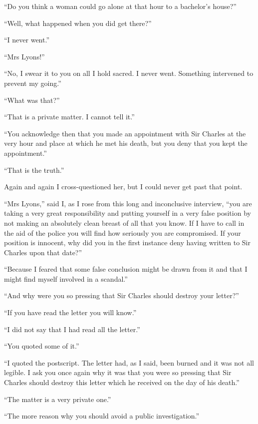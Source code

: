 \documentclass[paper=5.5in:8.5in,BCOR=7mm,twoside,DIV=calc,12pt,usegeometry,openany,chapterprefix,endperiod]{scrbook} %
\begin{document}
\enquote{Do you think a woman could go alone at that hour to a bachelor's house?}

\enquote{Well, what happened when you did get there?}

\enquote{I never went.}

\enquote{Mrs Lyons!}

\enquote{No, I swear it to you on all I hold sacred. I never went. Something intervened to prevent my going.}

\enquote{What was that?}

\enquote{That is a private matter. I cannot tell it.}

\enquote{You acknowledge then that you made an appointment with Sir Charles at the very hour and place at which he met his death, but you deny that you kept the appointment.}

\enquote{That is the truth.}

Again and again I cross-questioned her, but I could never get past that point.

\enquote{Mrs Lyons,} said I, as I rose from this long and inconclusive interview, \enquote{you are taking a very great responsibility and putting yourself in a very false position by not making an absolutely clean breast of all that you know. If I have to call in the aid of the police you will find how seriously you are compromised. If your position is innocent, why did you in the first instance deny having written to Sir Charles upon that date?}

\enquote{Because I feared that some false conclusion might be drawn from it and that I might find myself involved in a scandal.}

\enquote{And why were you so pressing that Sir Charles should destroy your letter?}

\enquote{If you have read the letter you will know.}

\enquote{I did not say that I had read all the letter.}

\enquote{You quoted some of it.}

\enquote{I quoted the postscript. The letter had, as I said, been burned and it was not all legible. I ask you once again why it was that you were so pressing that Sir Charles should destroy this letter which he received on the day of his death.}

\enquote{The matter is a very private one.}

\enquote{The more reason why you should avoid a public investigation.}
\end{document}
